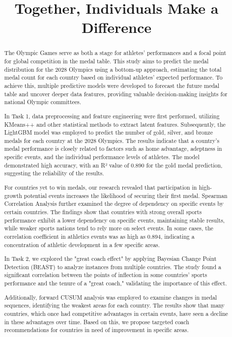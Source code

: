 \documentclass[12pt]{article}  %
\title{Together, Individuals Make a Difference}  %
\begin{document}
\begin{abstract}
The Olympic Games serve as both a stage for athletes' performances and a focal point for global competition in the medal table. This study aims to predict the medal distribution for the 2028 Olympics using a bottom-up approach, estimating the total medal count for each country based on individual athletes' expected performance. To achieve this, multiple predictive models were developed to forecast the future medal table and uncover deeper data features, providing valuable decision-making insights for national Olympic committees.

In Task 1, data preprocessing and feature engineering were first performed, utilizing KMeans++ and other statistical methods to extract latent features. Subsequently, the LightGBM model was employed to predict the number of gold, silver, and bronze medals for each country at the 2028 Olympics. 
The results indicate that a country's medal performance is closely related to factors such as home advantage, adeptness in specific events, and the individual performance levels of athletes. The model demonstrated high accuracy, with an R² value of 0.890 for the gold medal prediction, suggesting the reliability of the results.

For countries yet to win medals, our research revealed that participation in high-growth potential events increases the likelihood of securing their first medal. Spearman Correlation Analysis further examined the degree of dependency on specific events by certain countries. The findings show that countries with strong overall sports performance exhibit a lower dependency on specific events, maintaining stable results, while weaker sports nations tend to rely more on select events. In some cases, the correlation coefficient in athletics events was as high as 0.894, indicating a concentration of athletic development in a few specific areas.

In Task 2, we explored the "great coach effect" by applying Bayesian Change Point Detection (BEAST) to analyze instances from multiple countries. The study found a significant correlation between the points of inflection in some countries' sports performance and the tenure of a "great coach," validating the importance of this effect.

Additionally, forward CUSUM analysis was employed to examine changes in medal sequences, identifying the weakest areas for each country. The results show that many countries, which once had competitive advantages in certain events, have seen a decline in these advantages over time. Based on this, we propose targeted coach recommendations for countries in need of improvement in specific areas.


\end{abstract}
\end{document}
